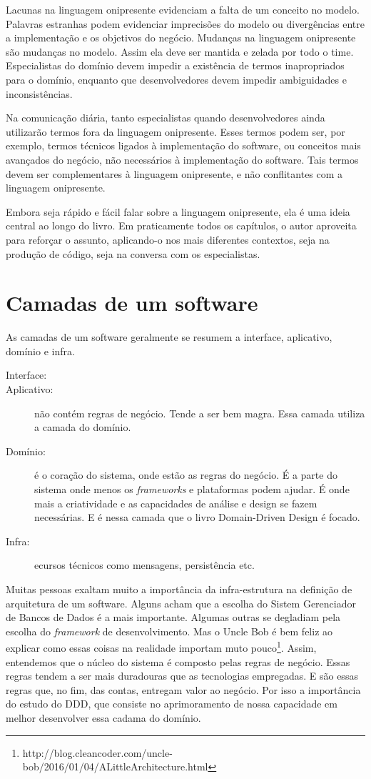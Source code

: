 \documentclass[a4paper, 12pt]{article}
\newcommand{\lgg}{linguagem onipresente\xspace}
\begin{document}
Lacunas na linguagem onipresente evidenciam a falta de um conceito no modelo. Palavras estranhas podem evidenciar imprecisões do modelo ou divergências entre a implementação e os objetivos do negócio. Mudanças na linguagem onipresente são mudanças no modelo. Assim ela deve ser mantida e zelada por todo o time. Especialistas do domínio devem impedir a existência de termos inapropriados para o domínio, enquanto que desenvolvedores devem impedir ambiguidades e inconsistências.

Na comunicação diária, tanto especialistas quando desenvolvedores ainda utilizarão termos fora da linguagem onipresente. Esses termos podem ser, por exemplo, termos técnicos ligados à implementação do software, ou conceitos mais avançados do negócio, não necessários à implementação do software. Tais termos devem ser complementares à linguagem onipresente, e não conflitantes com a linguagem onipresente.

Embora seja rápido e fácil falar sobre a \lgg, ela é uma ideia central ao longo do livro. Em praticamente todos os capítulos, o autor aproveita para reforçar o assunto, aplicando-o nos mais diferentes contextos, seja na produção de código, seja na conversa com os especialistas.


\section{Camadas de um software}

As camadas de um software geralmente se resumem a interface, aplicativo, domínio e infra.

\begin{description}
\item [Interface:]
\item [Aplicativo:] não contém regras de negócio. Tende a ser bem magra. Essa camada utiliza a camada do domínio.
\item [Domínio:] é o coração do sistema, onde estão as regras do negócio. É a parte do sistema onde menos os \emph{frameworks} e plataformas podem ajudar. É onde mais a criatividade e as capacidades de análise e design se fazem necessárias. E é nessa camada que o livro Domain-Driven Design é focado.
\item [Infra:] ecursos técnicos como mensagens, persistência etc.
\end{description}

Muitas pessoas exaltam muito a importância da infra-estrutura na definição de arquitetura de um software. Alguns acham que a escolha do Sistem Gerenciador de Bancos de Dados é a mais importante. Algumas outras se degladiam pela escolha do \emph{framework} de desenvolvimento. Mas o Uncle Bob é bem feliz ao explicar como essas coisas na realidade importam muto pouco\footnote{http://blog.cleancoder.com/uncle-bob/2016/01/04/ALittleArchitecture.html}. Assim, entendemos que o núcleo do sistema é composto pelas regras de negócio. Essas regras tendem a ser mais duradouras que as tecnologias empregadas. E são essas regras que, no fim, das contas, entregam valor ao negócio. Por isso a importância do estudo do DDD, que consiste no aprimoramento de nossa capacidade em melhor desenvolver essa cadama do domínio.
\end{document}
